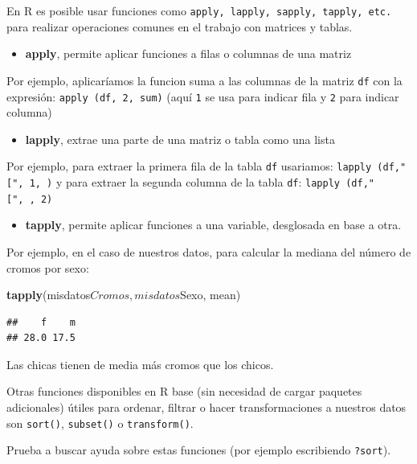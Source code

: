 \documentclass[]{book}
\newenvironment{Shaded}{\begin{snugshade}}{\end{snugshade}}
\newcommand{\KeywordTok}[1]{\textcolor[rgb]{0.13,0.29,0.53}{\textbf{{#1}}}}
\newcommand{\NormalTok}[1]{{#1}}
\providecommand{\tightlist}{%
  \setlength{\itemsep}{0pt}\setlength{\parskip}{0pt}}
\theoremstyle{definition}
\theoremstyle{definition}
\theoremstyle{remark}
\begin{document}
En R es posible usar funciones como
\texttt{apply,\ lapply,\ sapply,\ tapply,\ etc.} para realizar
operaciones comunes en el trabajo con matrices y tablas.

\begin{itemize}
\tightlist
\item
  \textbf{apply}, permite aplicar funciones a filas o columnas de una
  matriz
\end{itemize}

Por ejemplo, aplicaríamos la funcion suma a las columnas de la matriz
\texttt{df} con la expresión: \texttt{apply\ (df,\ 2,\ sum)} (aquí
\texttt{1} se usa para indicar fila y \texttt{2} para indicar columna)

\begin{itemize}
\tightlist
\item
  \textbf{lapply}, extrae una parte de una matriz o tabla como una lista
\end{itemize}

Por ejemplo, para extraer la primera fila de la tabla \texttt{df}
usariamos: \texttt{lapply\ (df,"{[}",\ 1,\ )} y para extraer la segunda
columna de la tabla \texttt{df}: \texttt{lapply\ (df,"{[}",\ ,\ 2)}

\begin{itemize}
\tightlist
\item
  \textbf{tapply}, permite aplicar funciones a una variable, desglosada
  en base a otra.
\end{itemize}

Por ejemplo, en el caso de nuestros datos, para calcular la mediana del
número de cromos por sexo:

\begin{Shaded}
\begin{Highlighting}[]
\KeywordTok{tapply}\NormalTok{(misdatos$Cromos, misdatos$Sexo, mean)}
\end{Highlighting}
\end{Shaded}

\begin{verbatim}
##    f    m 
## 28.0 17.5
\end{verbatim}

Las chicas tienen de media más cromos que los chicos.

Otras funciones disponibles en R base (sin necesidad de cargar paquetes
adicionales) útiles para ordenar, filtrar o hacer transformaciones a
nuestros datos son \texttt{sort()}, \texttt{subset()} o
\texttt{transform()}.

Prueba a buscar ayuda sobre estas funciones (por ejemplo escribiendo
\texttt{?sort}).
\end{document}

